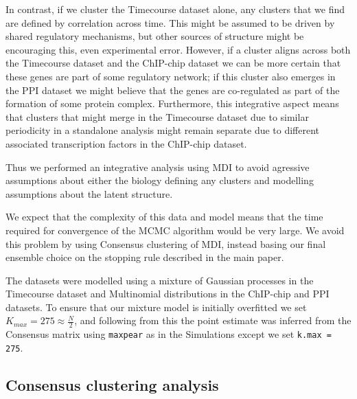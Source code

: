 \documentclass[]{article}
\begin{document}
In contrast, if we cluster the Timecourse dataset alone, any clusters that we find are defined by correlation across time. This might be assumed to be driven by shared regulatory mechanisms, but other sources of structure might be encouraging this, even experimental error. However, if a cluster aligns across both the Timecourse dataset and the ChIP-chip dataset we can be more certain that these genes are part of some regulatory network; if this cluster also emerges in the PPI dataset we might believe that the genes are co-regulated as part of the formation of some protein complex. Furthermore, this integrative aspect means that clusters that might merge in the Timecourse dataset due to similar periodicity in a standalone analysis might remain separate due to different associated transcription factors in the ChIP-chip dataset.

Thus we performed an integrative analysis using MDI to avoid agressive assumptions about either the biology defining any clusters and modelling assumptions about the latent structure.


We expect that the complexity of this data and model means that the time required for convergence of the MCMC algorithm would be very large. We avoid this problem by using Consensus clustering of MDI, instead basing our final ensemble choice on the stopping rule described in the main paper. %

The datasets were modelled using a mixture of Gaussian processes in the Timecourse dataset and Multinomial distributions in the ChIP-chip and PPI datasets. To ensure that our mixture model is initially overfitted we set $K_{max}=275\approx\frac{N}{2}$, and following from this the point estimate was inferred from the Consensus matrix using \texttt{maxpear} as in the Simulations except we set \texttt{k.max = 275}. 

\subsection{Consensus clustering analysis} \label{sec:consensusClustering}
\end{document}
